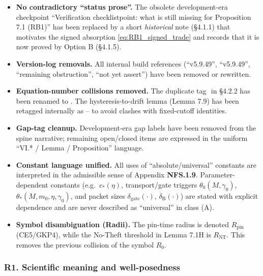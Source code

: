 \documentclass[
  11pt,
]{article}
\begin{document}
\begin{itemize}
\item
  \textbf{No contradictory ``status prose''.} The obsolete development-era checkpoint ``Verification checklistpoint: what is still missing for Proposition 7.1 (RB1)'' has been replaced by a short \emph{historical} note (§4.1.1) that motivates the signed absorption \eqref{eq:RB1_signed_trade} and records that it is now proved by Option B (§4.1.5).
\item
  \textbf{Version-log removals.} All internal build references (``v5.9.49'', ``v5.9.49'', ``remaining obstruction'', ``not yet assert'') have been removed or rewritten.
\item
  \textbf{Equation-number collisions removed.} The duplicate tag \(\tag{7.3}\) in §4.2.2 has been renamed to \(\tag{7.6}\). The hysteresis-to-drift lemma (Lemma 7.9) has been retagged internally as \(\tag{7.9a}\)--\(\tag{7.9f}\) to avoid clashes with fixed-cutoff identities.
\item
  \textbf{Gap-tag cleanup.} Development-era gap labels have been removed from the spine narrative; remaining open/closed items are expressed in the uniform ``VI.* / Lemma / Proposition'' language.
\item
  \textbf{Constant language unified.} All uses of ``absolute/universal'' constants are interpreted in the admissible sense of Appendix \textbf{NFS.1.9}. Parameter-dependent constants (e.g.~\(c_*(\eta)\), transport/gate triggers \(\theta_0(M,\gamma_0)\), \(\theta_*(M,m_0,\eta,\gamma_0)\), and packet sizes \(\delta_{\mathrm{gate}}(\cdot)\), \(\delta_{\mathrm{B}}(\cdot)\)) are stated with explicit dependence and are never described as ``universal'' in class (A).
\item
  \textbf{Symbol disambiguation (Radii).} The pin-time radius is denoted \(R_{\mathrm{pin}}\) (CE5/GKP4), while the No-Theft threshold in Lemma 7.1H is \(R_{\mathrm{NT}}\). This removes the previous collision of the symbol \(R_0\).
\end{itemize}

\hypertarget{r1.-scientific-meaning-and-well-posedness}{%
\subsubsection{R1. Scientific meaning and well-posedness}\label{r1.-scientific-meaning-and-well-posedness}}
\end{document}
